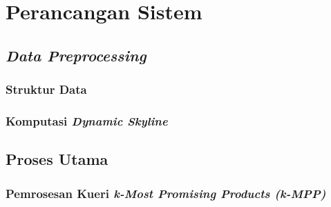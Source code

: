 \section{Perancangan Sistem}
\subsection{\textit{Data Preprocessing}}
\subsubsection{Struktur Data}
\subsubsection{Komputasi \textit{Dynamic Skyline}}
\subsection{Proses Utama}
\subsubsection{Pemrosesan Kueri \textit{k-Most Promising Products (k-MPP)}}
